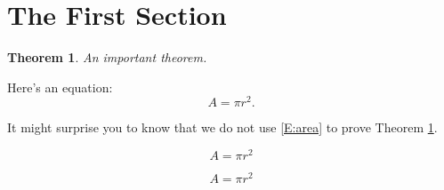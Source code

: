 \documentclass{article}
\theoremstyle{plain}
\newtheorem{theorem}{Theorem}[section]
\begin{document}
\section{The First Section}
\setcounter{theorem}{3}
\setcounter{equation}{20}
\begin{theorem} \label{T:first}
An important theorem.
\end{theorem}

Here's an equation:
\begin{equation} \label{E:area}
A = \pi r^2.
\end{equation}

It might surprise you to know that we do not use \eqref{E:area} to prove Theorem \ref{T:first}.

\begin{equation}
A = \pi r^2 \tag{area of a circle}
\end{equation}

\begin{equation}
A = \pi r^2 \tag{$\star$}
\end{equation}
\end{document}
